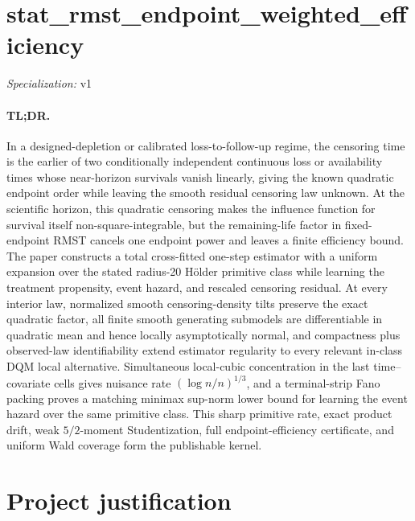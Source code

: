 \documentclass{article}
\begin{document}
\sloppy

\section*{stat\_\allowbreak{}rmst\_\allowbreak{}endpoint\_\allowbreak{}weighted\_\allowbreak{}efficiency}

\noindent\textit{Specialization:} v1\par

\paragraph{TL;DR.} In a designed-depletion or calibrated loss-to-follow-up regime, the censoring time is the earlier of two conditionally independent continuous loss or availability times whose near-horizon survivals vanish linearly, giving the known quadratic endpoint order while leaving the smooth residual censoring law unknown. At the scientific horizon, this quadratic censoring makes the influence function for survival itself non-square-integrable, but the remaining-life factor in fixed-endpoint RMST cancels one endpoint power and leaves a finite efficiency bound. The paper constructs a total cross-fitted one-step estimator with a uniform expansion over the stated radius-20 H\"older primitive class while learning the treatment propensity, event hazard, and rescaled censoring residual. At every interior law, normalized smooth censoring-density tilts preserve the exact quadratic factor, all finite smooth generating submodels are differentiable in quadratic mean and hence locally asymptotically normal, and compactness plus observed-law identifiability extend estimator regularity to every relevant in-class DQM local alternative. Simultaneous local-cubic concentration in the last time--covariate cells gives nuisance rate \( (\log n/n)^{1/3} \), and a terminal-strip Fano packing proves a matching minimax sup-norm lower bound for learning the event hazard over the same primitive class. This sharp primitive rate, exact product drift, weak \(5/2\)-moment Studentization, full endpoint-efficiency certificate, and uniform Wald coverage form the publishable kernel.

\section{Project justification}
\end{document}
